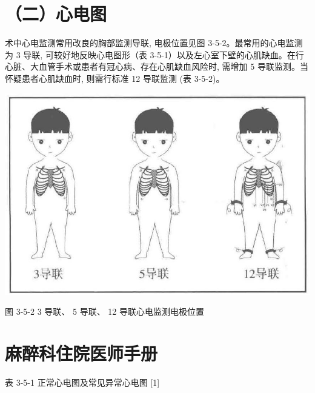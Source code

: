 \documentclass[10pt]{article}
\begin{document}
\section*{（二）心电图}
术中心电监测常用改良的胸部监测导联, 电极位置见图 3-5-2。最常用的心电监测为 3 导联, 可较好地反映心电图形（表 3-5-1）以及左心室下壁的心肌缺血。在行心脏、大血管手术或患者有冠心病、存在心肌缺血风险时, 需增加 5 导联监测。当怀疑患者心肌缺血时, 则需行标准 12 导联监测 (表 3-5-2)。

\begin{center}
\includegraphics[max width=\textwidth]{2024_07_05_645bb794a4d4f32ee0c8g-095(1)}
\end{center}

图 3-5-2 3 导联、 5 导联、 12 导联心电监测电极位置

\section*{麻醉科住院医师手册}
表 3-5-1 正常心电图及常见异常心电图 [1]
\end{document}
